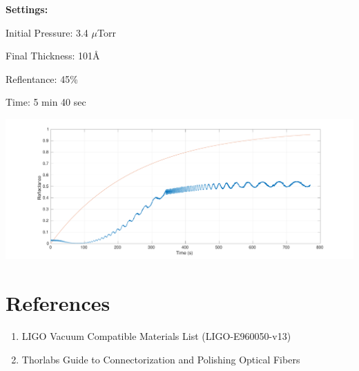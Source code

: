 \documentclass{article}
\begin{document}
\textbf{Settings:}

Initial Pressure: 3.4 $\mu$Torr

Final Thickness: 101\AA

Reflentance: 45\%

Time:  5 min 40 sec

\includegraphics[width=\textwidth]{BS_Coating_Fiber_Time.pdf}
\section{References}
\begin{enumerate}
\item LIGO Vacuum Compatible Materials List (LIGO-E960050-v13)
\item Thorlabs Guide to Connectorization and Polishing Optical Fibers 
\end{enumerate}
\end{document}
